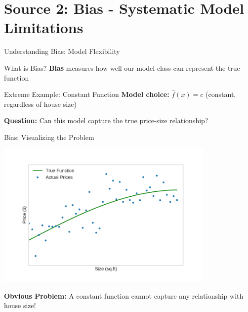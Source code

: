 \documentclass[10pt]{beamer}
\newcommand{\fitpic}[1]{\begin{adjustbox}{max width=\linewidth, max totalheight=0.78\textheight}#1\end{adjustbox}}
\begin{document}
\section{Source 2: Bias - Systematic Model Limitations}

\begin{frame}{Understanding Bias: Model Flexibility}
\begin{definitionbox}{What is Bias?}
\textbf{Bias} measures how well our model class can represent the true function
\end{definitionbox}

\begin{examplebox}{Extreme Example: Constant Function}
\textbf{Model choice:} $\hat{f}(x) = c$ (constant, regardless of house size)

\textbf{Question:} Can this model capture the true price-size relationship?
\end{examplebox}
\end{frame}

\begin{frame}{Bias: Visualizing the Problem}
\begin{center}
\fitpic{\includegraphics[width=0.8\textwidth]{../assets/bias-variance/figures/biasn_1.pdf}}
\end{center}

\begin{alertbox}
\textbf{Obvious Problem:} A constant function cannot capture any relationship with house size!
\end{alertbox}
\end{frame}
\end{document}

